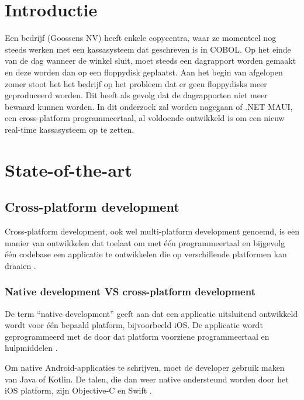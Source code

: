 
\section{Introductie}%
\label{sec:introductie}

Een bedrijf (Goossens NV) heeft enkele copycentra, waar ze momenteel nog steeds werken met een kassasysteem dat geschreven is in COBOL. Op het einde van de dag wanneer de winkel sluit, moet steeds een dagrapport worden gemaakt en deze worden dan op een floppydisk geplaatst. Aan het begin van afgelopen zomer stoot het het bedrijf op het probleem dat er geen floppydisks meer geproduceerd worden. Dit heeft als gevolg dat de dagrapporten niet meer bewaard kunnen worden. In dit onderzoek zal worden nagegaan of .NET MAUI, een cross-platform programmeertaal, al voldoende ontwikkeld is om een nieuw real-time kassasysteem op te zetten.


\section{State-of-the-art}%
\label{sec:state-of-the-art}

\subsection{Cross-platform development}
Cross-platform development, ook wel multi-platform development genoemd, is een manier van ontwikkelen dat toelaat om met één programmeertaal en bijgevolg één codebase een applicatie te ontwikkelen die op verschillende platformen kan draaien \autocite{KotlinFoundation2022}. 

\subsubsection{Native development VS cross-platform development}
De term “native development” geeft aan dat een applicatie uitsluitend ontwikkeld wordt voor één bepaald platform, bijvoorbeeld iOS. De applicatie wordt geprogrammeerd met de door dat platform voorziene programmeertaal en hulpmiddelen \autocite{Marchuk}.

Om native Android-applicaties te schrijven, moet de developer gebruik maken van Java of Kotlin. De talen, die dan weer native ondersteund worden door het iOS platform, zijn Objective-C en Swift \autocite{Schmitt2022}.

